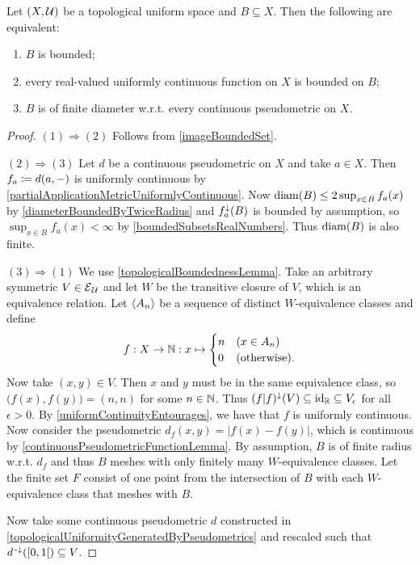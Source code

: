 \begin{proposition} \label{metricBoundedness}
Let $\sSet{X, \mathcal{U}}$ be a topological uniform space and $B\subseteq X$. Then the following are equivalent:
\begin{enumerate}
\item $B$ is bounded;
\item every real-valued uniformly continuous function on $X$ is bounded on $B$;
\item $B$ is of finite diameter w.r.t. every continuous pseudometric on $X$.
\end{enumerate}
\end{proposition}
\begin{proof}
$(1) \Rightarrow (2)$ Follows from \ref{imageBoundedSet}.

$(2) \Rightarrow (3)$ Let $d$ be a continuous pseudometric on $X$ and take $a\in X$. Then $f_a \coloneqq d(a,-)$ is uniformly continuous by \ref{partialApplicationMetricUniformlyContinuous}. Now $\operatorname{diam}(B)\leq 2\sup_{x\in B}f_a(x)$ by \ref{diameterBoundedByTwiceRadius} and $f_a^\downarrow(B)$ is bounded by assumption, so $\sup_{x\in B}f_a(x) < \infty $ by \ref{boundedSubsetsRealNumbers}. Thus $\operatorname{diam}(B)$ is also finite.

$(3) \Rightarrow (1)$ We use \ref{topologicalBoundednessLemma}. Take an arbitrary symmetric $V\in \operatorname{\mathcal{E}}_\mathcal{U}$ and let $W$ be the transitive closure of $V$, which is an equivalence relation. Let $\left\langle A_n \right\rangle$ be a sequence of distinct $W$-equivalence classes and define
\[ f: X\to \mathbb{N}: x\mapsto \begin{cases}
n & (x\in A_n) \\
0 & (\text{otherwise}).
\end{cases} \]
Now take $(x,y)\in V$. Then $x$ and $y$ must be in the same equivalence class, so $\big(f(x), f(y)\big) = (n,n)$ for some $n\in\mathbb{N}$. Thus $(f|f)^\downarrow(V)\subseteq \operatorname{id}_{\mathbb{R}} \subseteq V_\epsilon$ for all $\epsilon>0$. By \ref{uniformContinuityEntourages}, we have that $f$ is uniformly continuous. Now consider the pseudometric $d_f(x,y) = |f(x)-f(y)|$, which is continuous by \ref{continuousPseudometricFunctionLemma}. By assumption, $B$ is of finite radius w.r.t. $d_f$ and thus $B$ meshes with only finitely many $W$-equivalence classes. Let the finite set $F$ consist of one point from the intersection of $B$ with each $W$-equivalence class that meshes with $B$.

Now take some continuous pseudometric $d$ constructed in \ref{topologicalUniformityGeneratedByPseudometrics} and rescaled such that $d^\preimf(\interval[co]{0,1}) \subseteq V$.


\end{proof}

